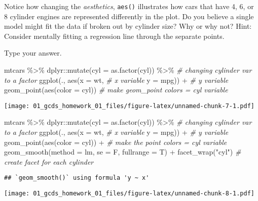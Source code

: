 \documentclass[
]{article}
\newenvironment{Shaded}{\begin{snugshade}}{\end{snugshade}}
\newcommand{\AttributeTok}[1]{\textcolor[rgb]{0.77,0.63,0.00}{#1}}
\newcommand{\CommentTok}[1]{\textcolor[rgb]{0.56,0.35,0.01}{\textit{#1}}}
\newcommand{\FunctionTok}[1]{\textcolor[rgb]{0.00,0.00,0.00}{#1}}
\newcommand{\NormalTok}[1]{#1}
\newcommand{\SpecialCharTok}[1]{\textcolor[rgb]{0.00,0.00,0.00}{#1}}
\newcommand{\StringTok}[1]{\textcolor[rgb]{0.31,0.60,0.02}{#1}}
\begin{document}
Notice how changing the \emph{aesthetics}, \texttt{aes()} illustrates
how cars that have 4, 6, or 8 cylinder engines are represented
differently in the plot. Do you believe a single model might fit the
data if broken out by cylinder size? Why or why not? Hint: Consider
mentally fitting a regression line through the separate points.

Type your answer.

\begin{Shaded}
\begin{Highlighting}[]
\NormalTok{mtcars }\SpecialCharTok{\%\textgreater{}\%}
\NormalTok{  dplyr}\SpecialCharTok{::}\FunctionTok{mutate}\NormalTok{(}\AttributeTok{cyl =} \FunctionTok{as.factor}\NormalTok{(cyl)) }\SpecialCharTok{\%\textgreater{}\%}  \CommentTok{\# changing cylinder var to a factor }
  \FunctionTok{ggplot}\NormalTok{(., }\FunctionTok{aes}\NormalTok{(}\AttributeTok{x =}\NormalTok{ wt,                    }\CommentTok{\# x variable}
                \AttributeTok{y =}\NormalTok{ mpg)) }\SpecialCharTok{+}                \CommentTok{\# y variable}
  \FunctionTok{geom\_point}\NormalTok{(}\FunctionTok{aes}\NormalTok{(}\AttributeTok{color =}\NormalTok{ cyl))             }\CommentTok{\# make geom\_point colors = cyl variable}
\end{Highlighting}
\end{Shaded}

\texttt{[image: 01\_gcds\_homework\_01\_files/figure-latex/unnamed-chunk-7-1.pdf]}

\begin{Shaded}
\begin{Highlighting}[]
\NormalTok{mtcars }\SpecialCharTok{\%\textgreater{}\%}
\NormalTok{  dplyr}\SpecialCharTok{::}\FunctionTok{mutate}\NormalTok{(}\AttributeTok{cyl =} \FunctionTok{as.factor}\NormalTok{(cyl)) }\SpecialCharTok{\%\textgreater{}\%}  \CommentTok{\# changing cylinder var to a factor }
  \FunctionTok{ggplot}\NormalTok{(., }\FunctionTok{aes}\NormalTok{(}\AttributeTok{x =}\NormalTok{ wt,                    }\CommentTok{\# x variable}
                \AttributeTok{y =}\NormalTok{ mpg)) }\SpecialCharTok{+}                \CommentTok{\# y variable}
  \FunctionTok{geom\_point}\NormalTok{(}\FunctionTok{aes}\NormalTok{(}\AttributeTok{color =}\NormalTok{ cyl)) }\SpecialCharTok{+}           \CommentTok{\# make the point colors = cyl variable}
  \FunctionTok{geom\_smooth}\NormalTok{(}\AttributeTok{method =} \StringTok{\textquotesingle{}lm\textquotesingle{}}\NormalTok{, }
              \AttributeTok{se =}\NormalTok{ F,}
              \AttributeTok{fullrange =}\NormalTok{ T) }\SpecialCharTok{+}
  \FunctionTok{facet\_wrap}\NormalTok{(}\StringTok{"cyl"}\NormalTok{)                        }\CommentTok{\# create facet for each cylinder}
\end{Highlighting}
\end{Shaded}

\begin{verbatim}
## `geom_smooth()` using formula 'y ~ x'
\end{verbatim}

\texttt{[image: 01\_gcds\_homework\_01\_files/figure-latex/unnamed-chunk-8-1.pdf]}
\end{document}
